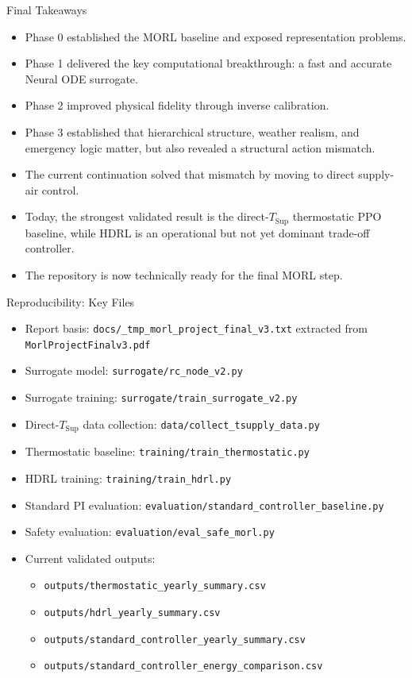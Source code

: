\documentclass[aspectratio=169,11pt]{beamer}
\begin{document}
\begin{frame}{Final Takeaways}
  \begin{itemize}
    \item Phase 0 established the MORL baseline and exposed representation problems.
    \item Phase 1 delivered the key computational breakthrough: a fast and accurate Neural ODE surrogate.
    \item Phase 2 improved physical fidelity through inverse calibration.
    \item Phase 3 established that hierarchical structure, weather realism, and emergency logic matter, but also revealed a structural action mismatch.
    \item The current continuation solved that mismatch by moving to direct supply-air control.
    \item Today, the strongest validated result is the direct-$T_{\mathrm{Sup}}$ thermostatic PPO baseline, while HDRL is an operational but not yet dominant trade-off controller.
    \item The repository is now technically ready for the final MORL step.
  \end{itemize}
\end{frame}

\appendix

\begin{frame}{Reproducibility: Key Files}
  \small
  \begin{itemize}
    \item Report basis: \texttt{docs/\_tmp\_morl\_project\_final\_v3.txt} extracted from \texttt{MorlProjectFinalv3.pdf}
    \item Surrogate model: \texttt{surrogate/rc\_node\_v2.py}
    \item Surrogate training: \texttt{surrogate/train\_surrogate\_v2.py}
    \item Direct-$T_{\mathrm{Sup}}$ data collection: \texttt{data/collect\_tsupply\_data.py}
    \item Thermostatic baseline: \texttt{training/train\_thermostatic.py}
    \item HDRL training: \texttt{training/train\_hdrl.py}
    \item Standard PI evaluation: \texttt{evaluation/standard\_controller\_baseline.py}
    \item Safety evaluation: \texttt{evaluation/eval\_safe\_morl.py}
    \item Current validated outputs:
    \begin{itemize}
      \item \texttt{outputs/thermostatic\_yearly\_summary.csv}
      \item \texttt{outputs/hdrl\_yearly\_summary.csv}
      \item \texttt{outputs/standard\_controller\_yearly\_summary.csv}
      \item \texttt{outputs/standard\_controller\_energy\_comparison.csv}
    \end{itemize}
  \end{itemize}
\end{frame}
\end{document}
